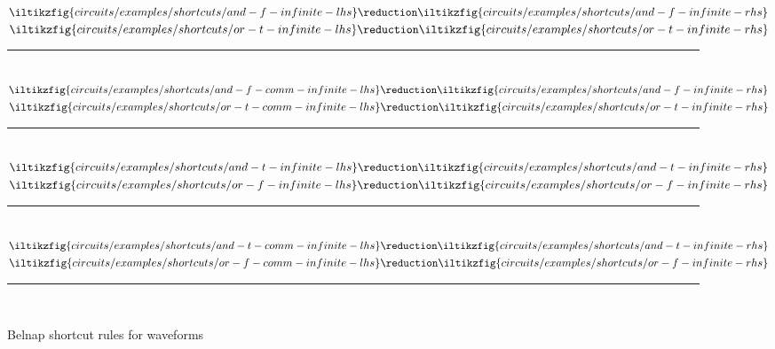 \documentclass{lmcs}
\begin{document}
\begin{figure}
    \centering
    \(
    \iltikzfig{circuits/examples/shortcuts/and-f-infinite-lhs}
    \reduction
    \iltikzfig{circuits/examples/shortcuts/and-f-infinite-rhs}
    \)
    \quad
    \(
    \iltikzfig{circuits/examples/shortcuts/or-t-infinite-lhs}
    \reduction
    \iltikzfig{circuits/examples/shortcuts/or-t-infinite-rhs}
    \)
    \\[0.3em]
    \rule{\textwidth}{0.1mm}
    \\[0.5em]
    \(
    \iltikzfig{circuits/examples/shortcuts/and-f-comm-infinite-lhs}
    \reduction
    \iltikzfig{circuits/examples/shortcuts/and-f-infinite-rhs}
    \)
    \quad
    \(
    \iltikzfig{circuits/examples/shortcuts/or-t-comm-infinite-lhs}
    \reduction
    \iltikzfig{circuits/examples/shortcuts/or-t-infinite-rhs}
    \)
    \\[0.3em]
    \rule{\textwidth}{0.1mm}
    \\[0.5em]
    \(
    \iltikzfig{circuits/examples/shortcuts/and-t-infinite-lhs}
    \reduction
    \iltikzfig{circuits/examples/shortcuts/and-t-infinite-rhs}
    \)
    \quad
    \(
    \iltikzfig{circuits/examples/shortcuts/or-f-infinite-lhs}
    \reduction
    \iltikzfig{circuits/examples/shortcuts/or-f-infinite-rhs}
    \)
    \\[0.3em]
    \rule{\textwidth}{0.1mm}
    \\[0.5em]
    \(
    \iltikzfig{circuits/examples/shortcuts/and-t-comm-infinite-lhs}
    \reduction
    \iltikzfig{circuits/examples/shortcuts/and-t-infinite-rhs}
    \)
    \quad
    \(
    \iltikzfig{circuits/examples/shortcuts/or-f-comm-infinite-lhs}
    \reduction
    \iltikzfig{circuits/examples/shortcuts/or-f-infinite-rhs}
    \)
    \\[0.3em]
    \rule{\textwidth}{0.1mm}
    \\[0.5em]
    \caption{Belnap shortcut rules for waveforms}
    \label{fig:shortcut-waveform-rules}
\end{figure}
\end{document}
